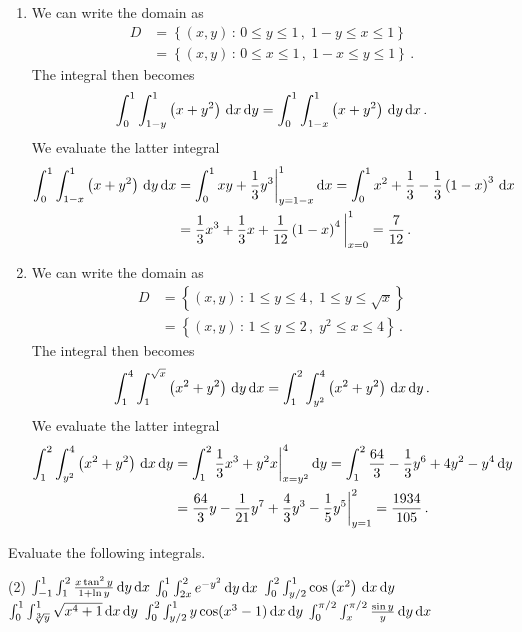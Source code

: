 \begin{solution}
\begin{enumerate}
\item
We can write the domain as
\begin{align*}
D &= \left\{ (x,y) \,:\, 0 \leq y \leq 1\,,\; 1-y \leq x \leq 1 \right\} \\
&= \left\{ (x,y) \,:\, 0 \leq x \leq 1\,,\; 1-x \leq y \leq 1 \right\}\,.
\end{align*}
The integral then becomes
\[
\int_0^1 \int_{1-y}^1 \left(x+y^2\right) \,\mathrm{d} x \,\mathrm{d} y = \int_0^1 \int_{1-x}^1 \left(x+y^2\right) \,\mathrm{d} y \,\mathrm{d} x \,.
\]
We evaluate the latter integral
\begin{align*}
\int_0^1 \int_{1-x}^1 \left(x+y^2\right) \,\mathrm{d} y \,\mathrm{d} x
&= \int_0^1 xy + \frac 13 y^3 \bigg|_{y=1-x}^1 \,\mathrm{d} x
= \int_0^1 x^2 + \frac 13 - \frac 13 \left(1 - x\right)^3 \,\mathrm{d} x \\
&= \frac 13 x^3 + \frac 13 x + \frac 1{12} \left(1-x\right)^4 \bigg|_{x=0}^1
= \frac 7{12}\,.
\end{align*}

\item
We can write the domain as
\begin{align*}
D &= \left\{ (x,y) \,:\, 1 \leq y \leq 4\,,\; 1 \leq y \leq \sqrt x \right\} \\
&= \left\{ (x,y) \,:\, 1 \leq y \leq 2\,,\; y^2 \leq x \leq 4 \right\}\,.
\end{align*}
The integral then becomes
\[
\int_1^4 \int_1^{\sqrt{x}} \left(x^2 + y^2\right) \,\mathrm{d} y \,\mathrm{d} x
= \int_1^2 \int_{y^2}^4 \left(x^2 + y^2 \right) \,\mathrm{d} x \,\mathrm{d} y\,.
\]
We evaluate the latter integral
\begin{align*}
\int_1^2 \int_{y^2}^4 \left(x^2 + y^2 \right) \,\mathrm{d} x \,\mathrm{d} y
&= \int_1^2 \frac 13 x^3 + y^2 x \bigg|_{x=y^2}^4 \,\mathrm{d} y
= \int_1^2 \frac{64}3 - \frac 13 y^6 + 4y^2 - y^4 \,\mathrm{d} y \\
&= \frac{64}{3} y - \frac 1{21}y^7 + \frac 43 y^3 - \frac 15 y^5 \bigg|_{y=1}^2
= \frac{1934}{105}\,.
\end{align*}
\end{enumerate}
\end{solution}

\begin{question}
Evaluate the following integrals.
\begin{tasks}(2)
\task
$\int_{-1}^1 \int_1^2 \frac{x \tan^2 y}{1 + \ln y} \,\mathrm{d} y \,\mathrm{d} x$
\task
$\int_0^1 \int_{2x}^2 e^{-y^2} \,\mathrm{d} y \,\mathrm{d} x$
\task
$\int_0^2 \int_{y/2}^1 \cos\left(x^2\right) \,\mathrm{d} x\,\mathrm{d} y$
\task
$\int_0^1 \int_{\sqrt[3]{y}}^1 \sqrt{x^4+1} \,\mathrm{d} x \,\mathrm{d} y$
\task
$\int_0^2 \int_{y/2}^1 y \cos (x^3 - 1) \,\mathrm{d} x \,\mathrm{d} y$
\task
$\int_0^{\pi/2} \int_x^{\pi/2} \frac{\sin y}{y} \,\mathrm{d} y \,\mathrm{d} x$
\end{tasks}
\end{question}

